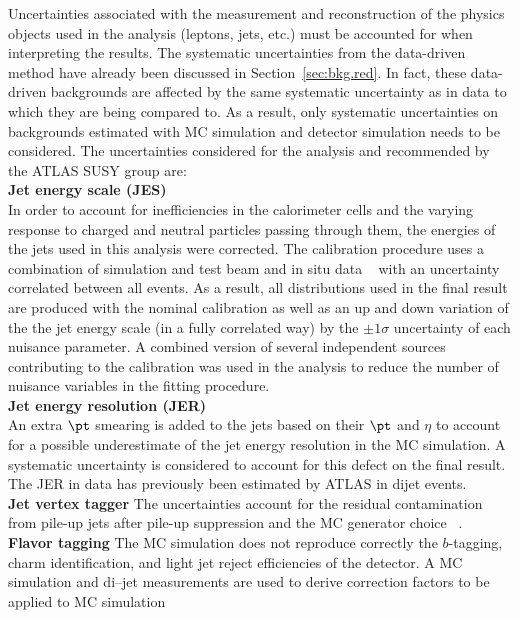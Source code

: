 Uncertainties associated with the measurement and reconstruction of the 
physics objects used in the analysis (leptons, jets, etc.) must be accounted
 for when interpreting the results.
The systematic uncertainties from the data-driven method have already been 
discussed in Section~\ref{sec:bkg.red}. In fact, these data-driven backgrounds 
are affected by the same systematic uncertainty as in data to which they 
are being compared to. As a result, only systematic uncertainties on 
backgrounds estimated with MC simulation and detector simulation needs to 
be considered. The uncertainties considered for the analysis and 
recommended by the ATLAS SUSY group are:\\
\textbf{Jet energy scale (JES)}  \\  
In order to account for inefficiencies in the calorimeter cells
and the varying response to charged and neutral particles passing through 
them, the energies of the jets used in this analysis were corrected. 
The calibration procedure uses a combination of simulation and test beam 
and in situ data ~\cite{Aaboud:2017jcu} with an uncertainty correlated 
between all events.
As a result, all distributions used in the final result are produced 
with the nominal calibration as well as an up and down variation of the 
the jet energy scale (in a fully correlated way) by the 
$\pm 1\sigma$ uncertainty of each nuisance parameter.
A combined version of several independent sources contributing to the 
calibration was used in the analysis 
to reduce the number of nuisance variables in the fitting procedure.\\
\textbf{Jet energy resolution (JER)} \\ %
An extra $\pt$ smearing is added to the jets based on their $\pt$ and $\eta$ 
to account for a possible underestimate of the jet energy resolution 
in the MC simulation. A systematic
uncertainty is considered to account for this defect on the final result. 
The JER in data has previously been estimated by ATLAS in dijet events. \\ %
\textbf{Jet vertex tagger}
The uncertainties account for the residual contamination from pile-up jets 
after pile-up suppression and the MC generator choice
~\cite{ATLAS-CONF-2014-018}.\\
\textbf{Flavor tagging}
The MC simulation does not reproduce correctly the $b$-tagging, 
charm identification, and light jet reject efficiencies of the detector. 
A \ttbar MC simulation and di--jet measurements are used to derive 
correction factors to be applied to MC simulation
